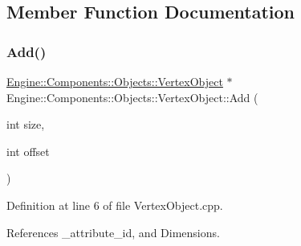 \subsection{Member Function Documentation}
\mbox{\label{classEngine_1_1Components_1_1Objects_1_1VertexObject_a18550cae56ca1066792528a7dcf5d28a}} 
\subsubsection{\texorpdfstring{Add()}{Add()}}
{\footnotesize\ttfamily \mbox{\hyperlink{classEngine_1_1Components_1_1Objects_1_1VertexObject}{Engine\+::\+Components\+::\+Objects\+::\+Vertex\+Object}} $\ast$ Engine\+::\+Components\+::\+Objects\+::\+Vertex\+Object\+::\+Add (\begin{DoxyParamCaption}\item[{int}]{size,  }\item[{int}]{offset }\end{DoxyParamCaption})\hspace{0.3cm}{\ttfamily [protected]}}



Definition at line 6 of file Vertex\+Object.\+cpp.



References \+\_\+attribute\+\_\+id, and Dimensions.


